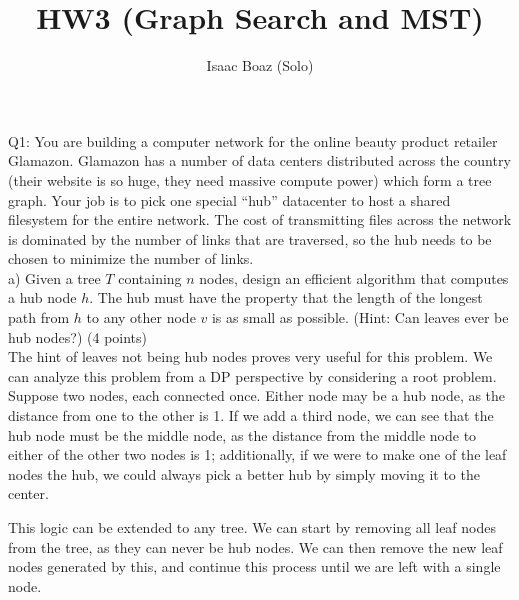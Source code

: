\documentclass[a4paper,12pt]{article}
\title{HW3 (Graph Search and MST)}
\author{Isaac Boaz (Solo)}
\begin{document}
\maketitle

\noindent Q1: You are building a computer network for the online beauty product
retailer Glamazon. Glamazon has a number of data centers distributed across the
country (their website is so huge, they need massive compute power) which form a
tree graph. Your job is to pick one special ``hub'' datacenter to host a shared
filesystem for the entire network. The cost of transmitting files across the
network is dominated by the number of links that are traversed, so the hub needs
to be chosen to minimize the number of links. \\
a) Given a tree $T$ containing $n$ nodes, design an efficient algorithm that
computes a hub node $h$. The hub must have the property that the length of the
longest path from $h$ to any other node $v$ is as small as possible. (Hint: Can
leaves ever be hub nodes?) (4 points) \\

The hint of leaves not being hub nodes proves very useful for this problem.
We can analyze this problem from a DP perspective by considering a root problem.
Suppose two nodes, each connected once. Either node may be a hub node, as
the distance from one to the other is 1. If we add a third node, we can see that
the hub node must be the middle node, as the distance from the middle node to
either of the other two nodes is 1; additionally, if we were to make one of the
leaf nodes the hub, we could always pick a better hub by simply moving it to
the center.

This logic can be extended to any tree. We can start by removing all leaf nodes
from the tree, as they can never be hub nodes. We can then remove the new leaf
nodes generated by this, and continue this process until we are left with a
single node.
\end{document}
